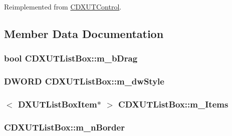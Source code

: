 Reimplemented from \hyperlink{class_c_d_x_u_t_control_a5fb3a79178c678abaa0da57566a09002}{CDXUTControl}.

\subsection{Member Data Documentation}
\hypertarget{class_c_d_x_u_t_list_box_aae46a4317bf8f102b191caa817e0e113}{
\subsubsection[{m\_\-bDrag}]{\setlength{\rightskip}{0pt plus 5cm}bool {\bf CDXUTListBox::m\_\-bDrag}}}
\label{class_c_d_x_u_t_list_box_aae46a4317bf8f102b191caa817e0e113}
\hypertarget{class_c_d_x_u_t_list_box_a0d9213ef6a8785539a01a54720163813}{
\subsubsection[{m\_\-dwStyle}]{\setlength{\rightskip}{0pt plus 5cm}DWORD {\bf CDXUTListBox::m\_\-dwStyle}}}
\label{class_c_d_x_u_t_list_box_a0d9213ef6a8785539a01a54720163813}
\hypertarget{class_c_d_x_u_t_list_box_ad238fcc6b420d21cdb320779f93436f5}{
\subsubsection[{m\_\-Items}]{$<$ {\bf DXUTListBoxItem}$\ast$ $>$ {\bf CDXUTListBox::m\_\-Items}}}
\label{class_c_d_x_u_t_list_box_ad238fcc6b420d21cdb320779f93436f5}
\hypertarget{class_c_d_x_u_t_list_box_a1e089c11156f403da3af68a1e1766363}{
\subsubsection[{m\_\-nBorder}]{ {\bf CDXUTListBox::m\_\-nBorder}}}
